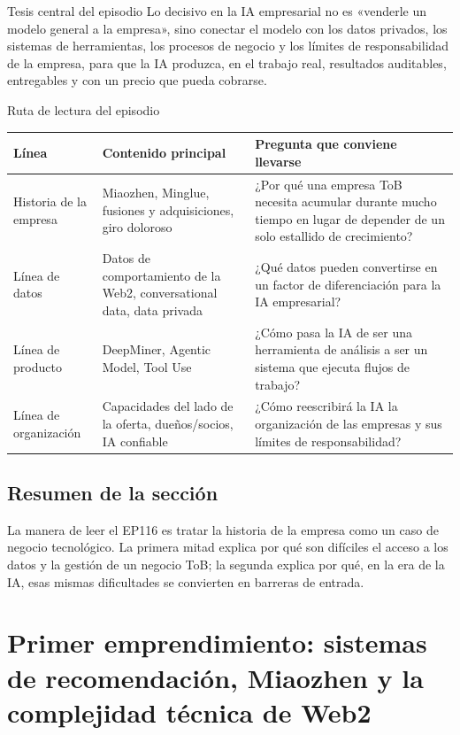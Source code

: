\documentclass[a4paper]{article}
\begin{document}
\begin{importantbox}{Tesis central del episodio}
Lo decisivo en la IA empresarial no es «venderle un modelo general a la empresa», sino conectar el modelo con los datos privados, los sistemas de herramientas, los procesos de negocio y los límites de responsabilidad de la empresa, para que la IA produzca, en el trabajo real, resultados auditables, entregables y con un precio que pueda cobrarse.
\end{importantbox}

\begin{knowledgebox}{Ruta de lectura del episodio}
\begin{tabularx}{\textwidth}{p{}p{}X}
\toprule
Línea & Contenido principal & Pregunta que conviene llevarse \\
\midrule
Historia de la empresa & Miaozhen, Minglue, fusiones y adquisiciones, giro doloroso & ¿Por qué una empresa ToB necesita acumular durante mucho tiempo en lugar de depender de un solo estallido de crecimiento? \\
Línea de datos & Datos de comportamiento de la Web2, conversational data, data privada & ¿Qué datos pueden convertirse en un factor de diferenciación para la IA empresarial? \\
Línea de producto & DeepMiner, Agentic Model, Tool Use & ¿Cómo pasa la IA de ser una herramienta de análisis a ser un sistema que ejecuta flujos de trabajo? \\
Línea de organización & Capacidades del lado de la oferta, dueños/socios, IA confiable & ¿Cómo reescribirá la IA la organización de las empresas y sus límites de responsabilidad? \\
\bottomrule
\end{tabularx}
\end{knowledgebox}

\subsection{Resumen de la sección}

La manera de leer el EP116 es tratar la historia de la empresa como un caso de negocio tecnológico. La primera mitad explica por qué son difíciles el acceso a los datos y la gestión de un negocio ToB; la segunda explica por qué, en la era de la IA, esas mismas dificultades se convierten en barreras de entrada.
\section{Primer emprendimiento: sistemas de recomendación, Miaozhen y la complejidad técnica de Web2}
\end{document}
